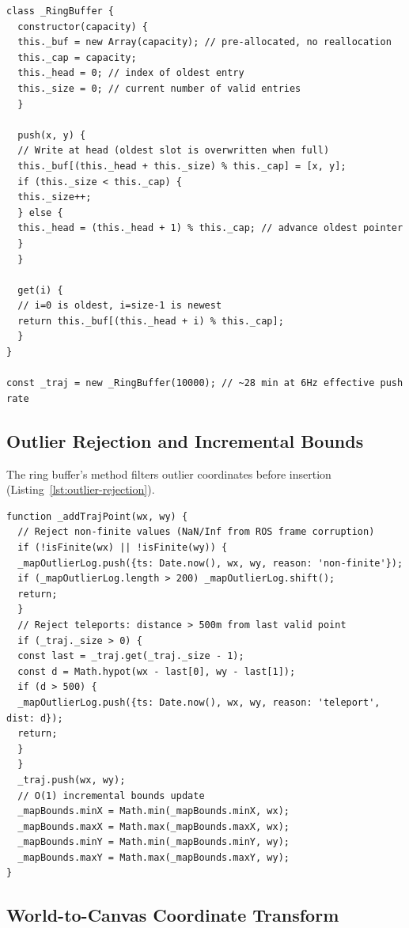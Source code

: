 \begin{lstlisting}[caption={O(1) ring buffer for real-time trajectory rendering}, label={lst:js-ring-buffer}]
class _RingBuffer {
  constructor(capacity) {
  this._buf = new Array(capacity); // pre-allocated, no reallocation
  this._cap = capacity;
  this._head = 0; // index of oldest entry
  this._size = 0; // current number of valid entries
  }

  push(x, y) {
  // Write at head (oldest slot is overwritten when full)
  this._buf[(this._head + this._size) % this._cap] = [x, y];
  if (this._size < this._cap) {
  this._size++;
  } else {
  this._head = (this._head + 1) % this._cap; // advance oldest pointer
  }
  }

  get(i) {
  // i=0 is oldest, i=size-1 is newest
  return this._buf[(this._head + i) % this._cap];
  }
}

const _traj = new _RingBuffer(10000); // ~28 min at 6Hz effective push rate
\end{lstlisting}

\subsection{Outlier Rejection and Incremental Bounds}

The ring buffer's  method filters outlier coordinates before insertion (Listing~\ref{lst:outlier-rejection}).

\begin{lstlisting}[caption={Trajectory outlier rejection with incremental bounds update}, label={lst:outlier-rejection}]
function _addTrajPoint(wx, wy) {
  // Reject non-finite values (NaN/Inf from ROS frame corruption)
  if (!isFinite(wx) || !isFinite(wy)) {
  _mapOutlierLog.push({ts: Date.now(), wx, wy, reason: 'non-finite'});
  if (_mapOutlierLog.length > 200) _mapOutlierLog.shift();
  return;
  }
  // Reject teleports: distance > 500m from last valid point
  if (_traj._size > 0) {
  const last = _traj.get(_traj._size - 1);
  const d = Math.hypot(wx - last[0], wy - last[1]);
  if (d > 500) {
  _mapOutlierLog.push({ts: Date.now(), wx, wy, reason: 'teleport', dist: d});
  return;
  }
  }
  _traj.push(wx, wy);
  // O(1) incremental bounds update
  _mapBounds.minX = Math.min(_mapBounds.minX, wx);
  _mapBounds.maxX = Math.max(_mapBounds.maxX, wx);
  _mapBounds.minY = Math.min(_mapBounds.minY, wy);
  _mapBounds.maxY = Math.max(_mapBounds.maxY, wy);
}
\end{lstlisting}

\subsection{World-to-Canvas Coordinate Transform}

